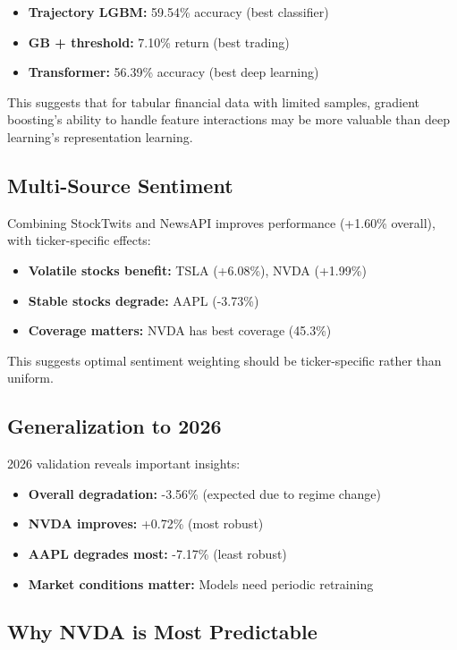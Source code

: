 \documentclass[10pt,twocolumn]{article}
\begin{document}
\begin{itemize}
\item \textbf{Trajectory LGBM:} 59.54\% accuracy (best classifier)
\item \textbf{GB + threshold:} 7.10\% return (best trading)
\item \textbf{Transformer:} 56.39\% accuracy (best deep learning)
\end{itemize}

This suggests that for tabular financial data with limited samples, gradient boosting's ability to handle feature interactions may be more valuable than deep learning's representation learning.

\subsection{Multi-Source Sentiment}

Combining StockTwits and NewsAPI improves performance (+1.60\% overall), with ticker-specific effects:

\begin{itemize}
\item \textbf{Volatile stocks benefit:} TSLA (+6.08\%), NVDA (+1.99\%)
\item \textbf{Stable stocks degrade:} AAPL (-3.73\%)
\item \textbf{Coverage matters:} NVDA has best coverage (45.3\%)
\end{itemize}

This suggests optimal sentiment weighting should be ticker-specific rather than uniform.

\subsection{Generalization to 2026}

2026 validation reveals important insights:

\begin{itemize}
\item \textbf{Overall degradation:} -3.56\% (expected due to regime change)
\item \textbf{NVDA improves:} +0.72\% (most robust)
\item \textbf{AAPL degrades most:} -7.17\% (least robust)
\item \textbf{Market conditions matter:} Models need periodic retraining
\end{itemize}

\subsection{Why NVDA is Most Predictable}
\end{document}
